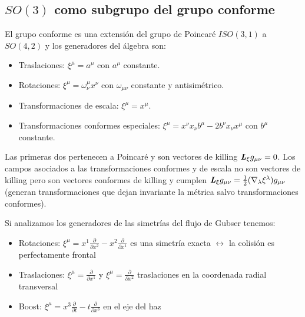 \documentclass[11pt,a4paper]{article}
\begin{document}
\subsection{$SO(3)$ como subgrupo del grupo conforme}

El grupo conforme es una extensión del grupo de Poincaré $ISO(3,1)$ a $SO(4,2)$ y los generadores del álgebra son:

\begin{itemize}
\item  Traslaciones: $\xi^{\mu}=a^{\mu}$ con $a^{\mu}$ constante.
\end{itemize}

\begin{itemize}
\item  Rotaciones: $\xi^{\mu}=\omega^{\mu}_{\nu}x^{\nu}$ con $\omega_{{\mu}{\nu}}$ constante y antisimétrico.
\end{itemize}

\begin{itemize}
\item  Transformaciones de escala: $\xi^{\mu}=x^{\mu}$.
\end{itemize}

\begin{itemize}
\item  Transformaciones conformes especiales: $\xi^{\mu}=x^{\nu}x_{\nu}b^{\mu}-2b^{\nu}x_{\nu}x^{\mu}$ con $b^{\mu}$ constante.
\end{itemize}


Las primeras dos pertenecen a Poincaré y son vectores de killing $\textbf{\textit{L}}_{\xi}g_{{\mu}{\nu}}=0$. Los campos asociados a las transformaciones conformes y de escala no son vectores de killing pero son vectores conformes de killing y cumplen $\textbf{\textit{L}}_{\xi}g_{{\mu}{\nu}}=\frac{1}{2}(\nabla_{\lambda}\xi^{\lambda})g_{{\mu}{\nu}}$ (generan transformaciones que dejan invariante la métrica salvo transformaciones conformes).

Si analizamos los generadores de las simetrías del flujo de Gubser tenemos:
\begin{itemize}
\item Rotaciones: $\xi^{\mu}=x^1\frac{\partial}{\partial{x}^2}-x^2\frac{\partial}{\partial{x}^1}$ es una simetría exacta $\leftrightarrow$ la colisión es perfectamente frontal
\item Traslaciones: $\xi^{\mu}=\frac{\partial}{\partial{x}^1}$ y $\xi^{\mu}=\frac{\partial}{\partial{x}^2}$  traslaciones en la coordenada radial transversal
\item Boost: $\xi^{\mu}=x^3\frac{\partial}{\partial{t}}-t\frac{\partial}{\partial{x}^3}$ en el eje del haz
\end{itemize}
\end{document}

